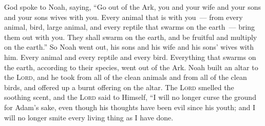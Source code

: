 \begin{inparaenum}
     God spoke to Noah, saying,%
     ``Go out of the Ark, you and your wife and your sons and your sons wives with you.%
     Every animal that is with you~--- from every animal, bird, large animal, and every reptile that swarms on the earth~--- bring them out with you. They shall swarm on the earth, and be fruitful and multiply on the earth.''%
     So Noah went out, his sons and his wife and his sons' wives with him.%
     Every animal and every reptile and every bird. Everything that swarms on the earth, according to their species, went out of the Ark.%
     Noah built an altar to the \textsc{Lord}, and he took from all of the clean animals and from all of the clean birds, and offered up a burnt offering on the altar.%
     The \textsc{Lord} smelled the soothing scent, and the \textsc{Lord} said to Himself, ``I will no longer curse the ground for Adam's sake, even though his thoughts have been evil since his youth; and I will no longer smite every living thing as I have done.%
    
    
\end{inparaenum}
